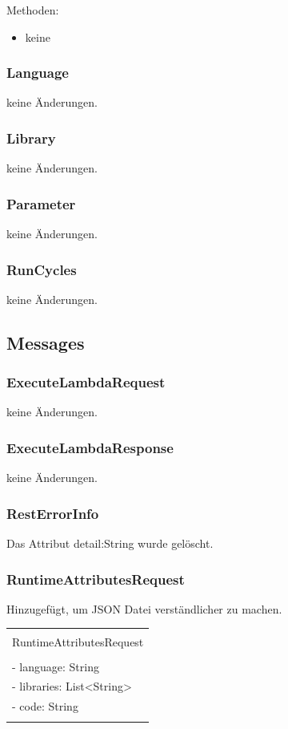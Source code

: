 \documentclass[a4paper,20pt,oneside]{book}
\begin{document}
	Methoden:
	\begin{itemize}
	\item keine
	\end{itemize}
	\subsubsection{Language}
	keine Änderungen.
	\subsubsection{Library}
	keine Änderungen.
	\subsubsection{Parameter}
	keine Änderungen.
	\subsubsection{RunCycles}
	keine Änderungen.
	\subsection{Messages}
	\subsubsection{ExecuteLambdaRequest}
	keine Änderungen.
	\subsubsection{ExecuteLambdaResponse}
	keine Änderungen.
	\subsubsection{RestErrorInfo}
	Das Attribut detail:String wurde gelöscht.
	\subsubsection{RuntimeAttributesRequest}
	
	Hinzugefügt, um JSON Datei verständlicher zu machen.
	
	
		\centering
	\begin{tabular}{|l|}
	\hline \\
	RuntimeAttributesRequest\\
	\hline \\
    - language: String\\
    - libraries: List<String>\\
    - code: String\\
    \hline \\
	\hline 
	\end{tabular}
	
\end{document}
